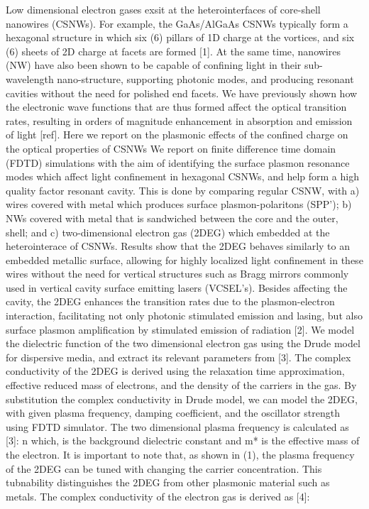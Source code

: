 
Low dimensional electron gases exsit at the heterointerfaces of core-shell nanowires (CSNWs). For example, the GaAs/AlGaAs CSNWs typically form a hexagonal structure in which six (6) pillars of 1D charge at the vortices, and six (6) sheets of 2D charge at facets  are formed [1]. At the same time, nanowires (NW) have also been shown to be capable of confining light in their sub-wavelength nano-structure, supporting photonic modes, and producing resonant cavities without the need for polished end facets. We have previously shown how the electronic wave functions that are thus formed affect the optical transition rates, resulting in orders of magnitude  enhancement in absorption and emission of light [ref]. Here we report on the plasmonic effects of the confined charge on the optical properties of CSNWs We report on finite difference time domain (FDTD) simulations with the aim of identifying the surface plasmon resonance modes which affect light confinement in hexagonal CSNWs, and help form a  high quality factor resonant cavity. This is done by comparing regular CSNW, with a) wires covered with metal which produces surface plasmon-polaritons (SPP’); b) NWs covered with metal that is sandwiched between the core and the outer, shell; and c) two-dimensional electron gas (2DEG)  which  embedded at the heterointerace of CSNWs. Results show that the 2DEG behaves similarly to an embedded metallic surface, allowing for highly localized light confinement in these wires without the need for vertical structures such as Bragg mirrors commonly used in vertical cavity surface emitting lasers (VCSEL’s). Besides affecting the cavity, the 2DEG enhances  the transition rates due to the plasmon-electron interaction, facilitating not only photonic stimulated emission and lasing, but also  surface plasmon amplification by stimulated emission of radiation [2].
    We model the dielectric function of the two dimensional electron gas using the Drude model for dispersive media, and extract its relevant parameters from [3]. The complex conductivity of the 2DEG is derived using the relaxation time approximation, effective reduced mass of electrons, and the density of the carriers in the gas. By substitution the complex conductivity in Drude model, we can model the 2DEG, with given plasma frequency, damping coefficient, and the oscillator strength using FDTD simulator.
    The two dimensional plasma frequency is calculated as [3]:
    n which,  is the background dielectric constant and m* is the effective mass of the electron. It is important to note that, as shown in (1), the plasma frequency of the 2DEG can be tuned with changing the carrier concentration. This tubnability distinguishes the 2DEG from other plasmonic material such as metals. The complex conductivity of the electron gas is derived as [4]:

